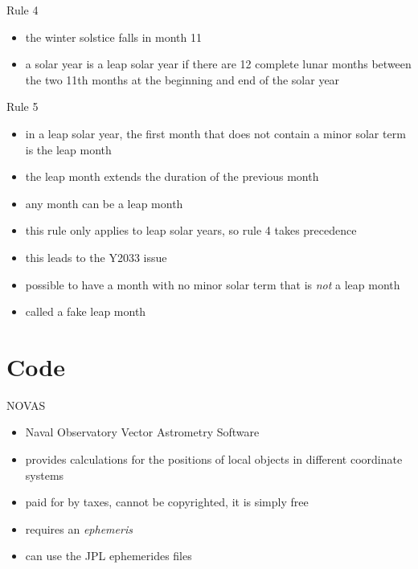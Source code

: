 \documentclass[table]{beamer}
\begin{document}
\begin{frame}{Rule 4}
  \begin{itemize}
  \item<+-> the winter solstice falls in month 11
  \item<+-> a solar year is a leap solar year if there are 12 complete lunar
    months between the two 11th months at the beginning and end of the solar
    year
  \end{itemize}
\end{frame}

\begin{frame}{Rule 5}
  \begin{itemize}
  \item<+-> in a leap solar year, the first month that does not contain a minor
    solar term is the leap month
  \item<+-> the leap month extends the duration of the previous month
  \item<+-> any month can be a leap month
  \item<+-> this rule only applies to leap solar years, so rule 4 takes precedence
  \item<+-> this leads to the Y2033 issue
  \item<+-> possible to have a month with no minor solar term that is
    \textit{not} a leap month
  \item<+-> called a fake leap month
  \end{itemize}
\end{frame}

\section{Code}

\begin{frame}{NOVAS}
  \begin{itemize}
  \item<+-> Naval Observatory Vector Astrometry Software
  \item<+-> provides calculations for the positions of local objects in
    different coordinate systems
  \item<+-> paid for by taxes, cannot be copyrighted, it is simply free
  \item<+-> requires an \textit{ephemeris}
  \item<+-> can use the JPL ephemerides files
  \end{itemize}
\end{frame}
\end{document}
